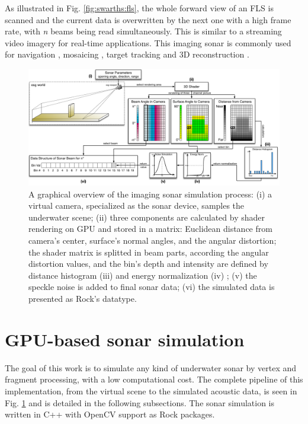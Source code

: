 \documentclass[final,5p,times]{elsarticle}
\begin{document}
As illustrated in Fig. \ref{fig:swarths:fls}, the whole forward view of an FLS is scanned and the current data is overwritten by the next one with a high frame rate, with \textit{n} beams being read simultaneously. This is similar to a streaming video imagery for real-time applications. This imaging sonar is commonly used for navigation \cite{fallon2013}, mosaicing \cite{hurtos2014}, target tracking \cite{liu2016} and 3D reconstruction \cite{huang2015}.


\begin{figure}[t]
    \includegraphics[width=0.85\paperwidth]{figs/sonar_sim}
    \centering
    \captionsetup{justification=centering}
    \caption{A graphical overview of the imaging sonar simulation process: (i) a virtual camera, specialized as the sonar device, samples the underwater scene; (ii) three components are calculated by shader rendering on GPU and stored in a matrix: Euclidean distance from camera's center, surface's normal angles, and the angular distortion; the shader matrix is splitted in beam parts, according the angular distortion values, and the bin's depth and intensity are defined by distance histogram (iii) and energy normalization (iv) ; (v) the speckle noise is added to final sonar data; (vi) the simulated data is presented as Rock's datatype.}
    \label{fig:sonar_sim}
\end{figure}



\section{GPU-based sonar simulation}
\label{dev}

The goal of this work is to simulate any kind of underwater sonar by vertex and fragment processing, with a low computational cost. The complete pipeline of this implementation, from the virtual scene to the simulated acoustic data, is seen in Fig. \ref{fig:sonar_sim} and is detailed in the following subsections. The sonar simulation is written in C++ with OpenCV \cite{bradski2000} support as Rock packages.
\end{document}
